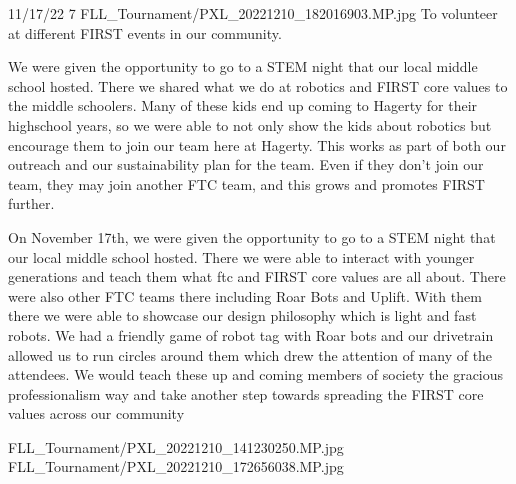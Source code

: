 {11/17/22}
{7}
{FLL_Tournament/PXL_20221210_182016903.MP.jpg}
{To volunteer at different FIRST events in our community.} 
{We were given the opportunity to go to a STEM night that our local middle school hosted. There we shared what we do at robotics and FIRST core values to the middle schoolers. Many of these kids end up coming to Hagerty for their highschool years, so we were able to not only show the kids about robotics but encourage them to join our team here at Hagerty. This works as part of both our outreach and our sustainability plan for the team. Even if they don’t join our team, they may join another FTC team, and this grows and promotes FIRST further. 

On November 17th, we were given the opportunity to go to a STEM night that our local middle school hosted. There we were able to interact with younger generations and teach them what ftc and FIRST core values are all about. There were also other FTC teams there including Roar Bots and Uplift. With them there we were able to showcase 	our design philosophy which is light and fast robots. We had 	a friendly game of robot tag with Roar bots and our drivetrain allowed us to run circles around them which drew the attention of many of the attendees. We would teach these up and coming members of society the gracious professionalism way and take another step towards spreading the FIRST core values across our community 
} 
{FLL_Tournament/PXL_20221210_141230250.MP.jpg}
{FLL_Tournament/PXL_20221210_172656038.MP.jpg}
